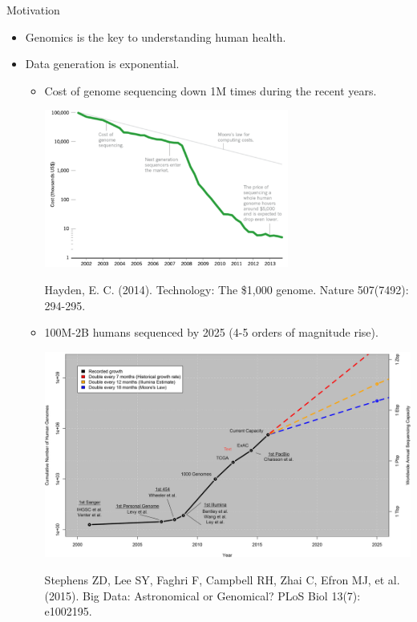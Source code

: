 \documentclass{beamer}
\begin{document}
\begin{frame}[fragile]
\begin{columns}[T]
\begin{column}{.32\textwidth}
\begin{block}{Motivation \hfill{}}
\begin{itemize}
\item Genomics is the key to understanding human health.
\item Data generation is exponential.
	\begin{itemize}
	\item Cost of genome sequencing down 1M times during the recent years.
	\begin{center}
	\includegraphics[height=14em,width=\linewidth]{img/sequencing.png}
	\vspace{-2mm}
	\end{center}
	\begin{flushright}
	\footnotesize Hayden, E. C. (2014). Technology: The \$1,000 genome. Nature 507(7492): 294-295.	
	\end{flushright}
	\item \small 100M-2B humans sequenced by 2025 (4-5 orders of magnitude rise).
	\begin{center}
	\includegraphics[width=\linewidth]{img/growth.png}
	\vspace{-2mm}
	\end{center}
	\begin{flushright}
	\footnotesize Stephens ZD, Lee SY, Faghri F, Campbell RH, Zhai C, Efron MJ, et al. (2015). Big Data: Astronomical or Genomical? PLoS Biol 13(7): e1002195.

\end{flushright}
\end{itemize}
\end{itemize}
\end{block}
\end{column}
\end{columns}
\end{frame}
\end{document}
